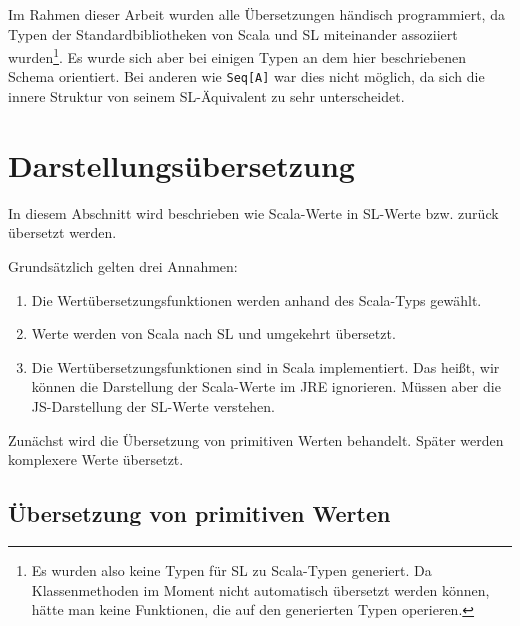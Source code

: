 \documentclass[12pt,bibtotoc]{scrreprt}
\begin{document}
Im Rahmen dieser Arbeit wurden alle Übersetzungen händisch programmiert, da Typen der Standardbibliotheken von Scala und SL miteinander assoziiert wurden\footnote{Es wurden also keine Typen für SL zu Scala-Typen generiert. Da Klassenmethoden im Moment nicht automatisch übersetzt werden können, hätte man keine Funktionen, die auf den generierten Typen operieren.}. Es wurde sich aber bei einigen Typen an dem hier beschriebenen Schema orientiert. Bei anderen wie \lstinline!Seq[A]! war dies nicht möglich, da sich die innere Struktur von seinem SL-Äquivalent zu sehr unterscheidet.


\section{Darstellungsübersetzung}
\label{sec:value-transformation}

In diesem Abschnitt wird beschrieben wie Scala-Werte in SL-Werte bzw. zurück übersetzt werden. 

Grundsätzlich gelten drei Annahmen: 
\begin{enumerate}
 \item Die Wertübersetzungsfunktionen werden anhand des Scala-Typs gewählt.
 \item Werte werden von Scala nach SL und umgekehrt übersetzt.
 \item Die Wertübersetzungsfunktionen sind in Scala implementiert. Das heißt, wir können die Darstellung der Scala-Werte im JRE ignorieren. Müssen aber die JS-Darstellung der SL-Werte verstehen.
\end{enumerate}

Zunächst wird die Übersetzung von primitiven Werten behandelt. Später werden komplexere Werte übersetzt.

\subsection{Übersetzung von primitiven Werten}
\label{subsec:primitive-value-translation}
\end{document}
